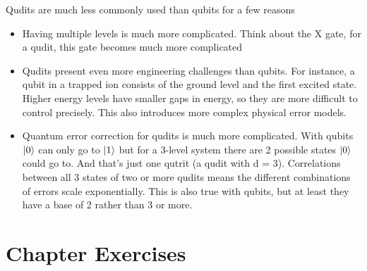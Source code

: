 Qudits are much less commonly used than qubits for a few reasons
\begin{itemize}
\item Having multiple levels is much more complicated. Think about the X gate, for a qudit, this gate becomes much more complicated

\item Qudits present even more engineering challenges than qubits. For instance, a qubit in a trapped ion consists of the ground level and the first excited state. Higher energy levels have smaller gaps in energy, so they are more difficult to control precisely. This also introduces more complex physical error models. 

\item Quantum error correction for qudits is much more complicated. With qubits $\ket{0}$ can only go to $\ket{1}$ but for a 3-level system there are 2 possible states $\ket{0}$ could go to. And that's just one qutrit (a qudit with d = 3). Correlations between all 3 states of two or more qudits means the different combinations of errors scale exponentially. This is also true with qubits, but at least they have a base of 2 rather than 3 or more.
\end{itemize}

\section{Chapter Exercises}


